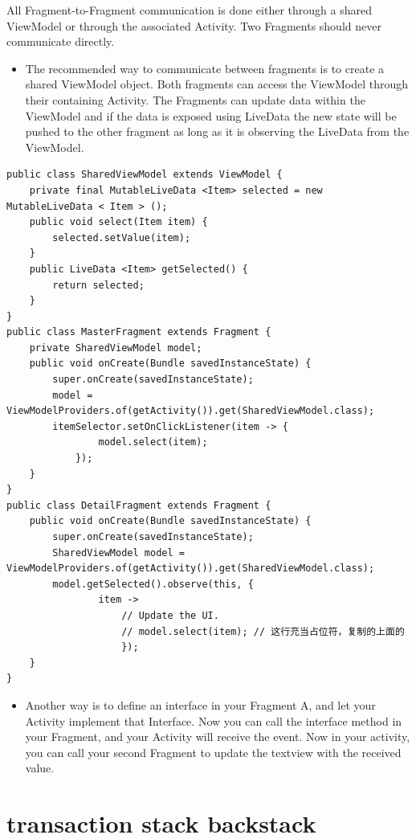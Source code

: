 \documentclass[9pt, b5paaper]{book}
\begin{document}
All Fragment-to-Fragment communication is done either through a shared ViewModel or through the associated Activity. Two Fragments should never communicate directly.

\begin{itemize}
\item The recommended way to communicate between fragments is to create a shared ViewModel object. Both fragments can access the ViewModel through their containing Activity. The Fragments can update data within the ViewModel and if the data is exposed using LiveData the new state will be pushed to the other fragment as long as it is observing the LiveData from the ViewModel.
\end{itemize}
\begin{verbatim}
public class SharedViewModel extends ViewModel {
    private final MutableLiveData <Item> selected = new MutableLiveData < Item > ();
    public void select(Item item) {
        selected.setValue(item);
    }
    public LiveData <Item> getSelected() {
        return selected;
    }
}
public class MasterFragment extends Fragment {
    private SharedViewModel model;
    public void onCreate(Bundle savedInstanceState) {
        super.onCreate(savedInstanceState);
        model = ViewModelProviders.of(getActivity()).get(SharedViewModel.class);
        itemSelector.setOnClickListener(item -> {
                model.select(item);
            });
    }
}
public class DetailFragment extends Fragment {
    public void onCreate(Bundle savedInstanceState) {
        super.onCreate(savedInstanceState);
        SharedViewModel model = ViewModelProviders.of(getActivity()).get(SharedViewModel.class);
        model.getSelected().observe(this, {
                item ->
                    // Update the UI.
                    // model.select(item); // 这行充当占位符，复制的上面的
                    });
    }
}
\end{verbatim}
\begin{itemize}
\item Another way is to define an interface in your Fragment A, and let your Activity implement that Interface. Now you can call the interface method in your Fragment, and your Activity will receive the event. Now in your activity, you can call your second Fragment to update the textview with the received value.
\end{itemize}

\section{transaction stack backstack}
\label{sec-9-1}
\end{document}
